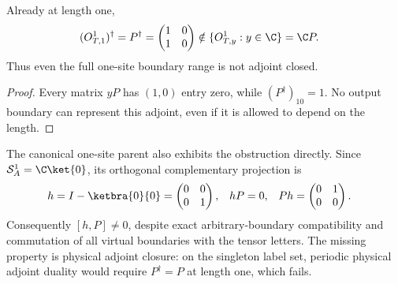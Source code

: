 \begin{lemma}
    \label{thm:glm_counterexample_not_adjoint}
    \leanok
    Already at length one,
    \begin{align}
        (O^1_{T,1})^\dagger=P^\dagger
         & =\begin{pmatrix}1&0\\1&0\end{pmatrix}
        \notin\{O^1_{T,y}:y\in\C\}=\C P.
        \label{eq:glm_counterexample_not_adjoint}
    \end{align}
    Thus even the full one-site boundary range is not adjoint closed.
\end{lemma}
\begin{proof}\leanok
    Every matrix $yP$ has $(1,0)$ entry zero, while
    $(P^\dagger)_{10}=1$. No output boundary can represent this adjoint,
    even if it is allowed to depend on the length.
\end{proof}

The canonical one-site parent also exhibits the obstruction directly.
Since $\mathcal S_A^1=\C\ket{0}$, its orthogonal complementary projection is
\begin{align}
    h=I-\ketbra{0}{0} & =\begin{pmatrix}0&0\\0&1\end{pmatrix}, &
    hP                & =0,                                    & Ph & =\begin{pmatrix}0&1\\0&0\end{pmatrix}.
    \label{eq:glm_counterexample_parent}
\end{align}
Consequently $[h,P]\ne0$, despite exact arbitrary-boundary compatibility
and commutation of all virtual boundaries with the tensor letters.
The missing property is physical adjoint closure: on the singleton
label set, periodic physical adjoint duality would require
$P^\dagger=P$ at length one, which fails.
